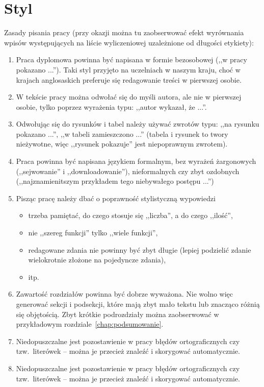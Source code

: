 \section{Styl}
\label{sec:Styl}
Zasady pisania pracy (przy okazji można tu zaobserwować efekt wyrównania wpisów występujących na liście wyliczeniowej uzależnione od długości etykiety):
\begin{enumerate}[labelwidth=\widthof{\ref{last-item}},label=\arabic*.]
\item Praca dyplomowa powinna być napisana w  formie bezosobowej (,,w pracy pokazano ...''). Taki styl przyjęto na uczelniach w naszym kraju, choć w krajach anglosaskich preferuje się redagowanie treści w pierwszej osobie.
\item W tekście pracy można odwołać się do myśli autora, ale nie w pierwszej osobie, tylko poprzez wyrażenia typu: ,,autor wykazał, że ...''. 
\item Odwołując się do rysunków i tabel należy używać zwrotów typu: ,,na rysunku pokazano ...'', ,,w tabeli zamieszczono ...'' (tabela i rysunek to twory nieżywotne, więc ,,rysunek pokazuje'' jest niepoprawnym zwrotem).
\item Praca powinna być napisana językiem formalnym, bez wyrażeń żargonowych (,,sejwowanie'' i ,,downloadowanie''), nieformalnych czy zbyt ozdobnych (,,najznamienitszym przykładem tego niebywałego postępu ...'')
\item Pisząc pracę należy dbać o poprawność stylistyczną wypowiedzi
\begin{itemize}
\item trzeba pamiętać, do czego stosuje się ,,liczba'', a do czego ,,ilość'',
\item nie ,,szereg funkcji'' tylko ,,wiele funkcji'',
\item redagowane zdania nie powinny być zbyt długie (lepiej podzielić zdanie wielokrotnie złożone na pojedyncze zdania),
\item itp.
\end{itemize}
\item Zawartość rozdziałów powinna być dobrze wyważona. Nie wolno więc generować sekcji i podsekcji, które mają zbyt mało tekstu lub znacząco różnią się objętością. Zbyt krótkie podrozdziały można zaobserwować w przykładowym rozdziale~\ref{chap:podsumowanie}.
\item Niedopuszczalne jest pozostawienie w pracy błędów ortograficznych czy tzw.\ literówek -- można je przecież znaleźć i skorygować
automatycznie. \addtocounter{enumi}{9997} 
\item  Niedopuszczalne jest pozostawienie w pracy błędów ortograficznych czy tzw.\ literówek -- można je przecież znaleźć i skorygować
automatycznie. \label{last-item}
\end{enumerate}


